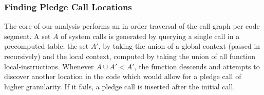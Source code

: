 \subsubsection{Finding Pledge Call Locations }

The core of our analysis performs an in-order traversal of the call graph per code segment. A set \(A\) of system calls is generated by querying a single call in a precomputed table; the set \(A'\), by taking the union of a global context (passed in recursively) and the local context, computed by taking the union of all function local-instructions. Whenever \(A \cup A' < A'\), the function descends and attempts to discover another location in the code which would allow for a pledge call of higher granularity. If it fails, a pledge call is inserted after the initial call.